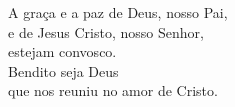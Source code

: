 A graça e a paz de Deus, nosso Pai, \\ e de Jesus Cristo, nosso Senhor, \\ estejam convosco. \\
\RbarRed{} Bendito seja Deus \\ que nos reuniu no amor de Cristo.
\vspace{.2cm} \\
